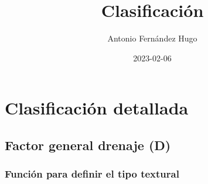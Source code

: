 \documentclass[
]{article}
\title{Clasificación}
\author{Antonio Fernández Hugo}
\date{2023-02-06}
\begin{document}
\maketitle

\hypertarget{clasificaciuxf3n-detallada}{%
\section{Clasificación detallada}\label{clasificaciuxf3n-detallada}}

\hypertarget{factor-general-drenaje-d}{%
\subsection{Factor general drenaje (D)}\label{factor-general-drenaje-d}}

\hypertarget{funciuxf3n-para-definir-el-tipo-textural}{%
\subsubsection{Función para definir el tipo
textural}\label{funciuxf3n-para-definir-el-tipo-textural}}
\end{document}
